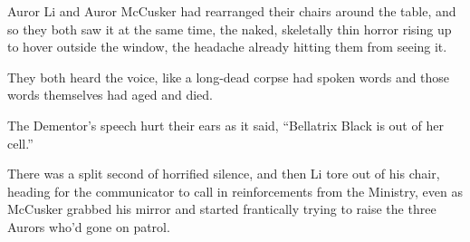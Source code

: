 Auror Li and Auror McCusker had rearranged their chairs around the
table, and so they both saw it at the same time, the naked, skeletally
thin horror rising up to hover outside the window, the headache already
hitting them from seeing it.

They both heard the voice, like a long-dead corpse had spoken words and
those words themselves had aged and died.

The Dementor's speech hurt their ears as it said, ``Bellatrix Black is
out of her cell.''

There was a split second of horrified silence, and then Li tore out of
his chair, heading for the communicator to call in reinforcements from
the Ministry, even as McCusker grabbed his mirror and started
frantically trying to raise the three Aurors who'd gone on patrol.
